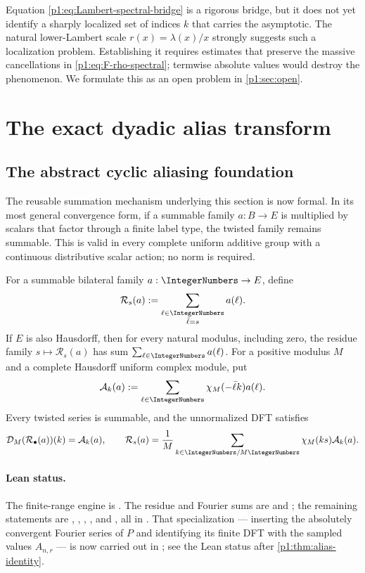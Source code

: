 \documentclass[11pt,oneside]{article}
\theoremstyle{definition}
\theoremstyle{remark}
\begin{document}
\begin{remark}
Equation \eqref{p1:eq:Lambert-spectral-bridge} is a rigorous bridge, but it does not
yet identify a sharply localized set of indices $k$ that carries the asymptotic.
The natural lower-Lambert scale $r(x)=\lambda(x)/x$ strongly suggests such a
localization problem.  Establishing it requires estimates that preserve the
massive cancellations in \eqref{p1:eq:F-rho-spectral}; termwise absolute values
would destroy the phenomenon.  We formulate this as an open problem in
\cref{p1:sec:open}.
\end{remark}

\section{The exact dyadic alias transform}\label{p1:sec:dct}

\subsection{The abstract cyclic aliasing foundation}

The reusable summation mechanism underlying this section is now formal.  In
its most general convergence form, if a summable family \(a:B\to E\) is
multiplied by scalars that factor through a finite label type, the twisted
family remains summable.  This is valid in every complete uniform additive
group with a continuous distributive scalar action; no norm is required.

For a summable bilateral family \(a:\IntegerNumbers\to E\), define
\[
 \mathcal R_s(a):=\sum_{\substack{\ell\in\IntegerNumbers\\\bar\ell=s}}a(\ell).
\]
If \(E\) is also Hausdorff, then for every natural modulus, including zero,
the residue family
\(s\mapsto\mathcal R_s(a)\) has sum \(\sum_{\ell\in\IntegerNumbers}a(\ell)\).
For a positive modulus \(M\) and a complete Hausdorff uniform complex
module, put
\[
 \mathcal A_k(a):=
 \sum_{\ell\in\IntegerNumbers}\chi_M(-\bar\ell k)a(\ell).
\]
Every twisted series is summable, and the unnormalized DFT satisfies
\[
 \mathcal D_M(\mathcal R_\bullet(a))(k)=\mathcal A_k(a),
 \qquad
 \mathcal R_s(a)=\frac1M\sum_{k\in\IntegerNumbers/M\IntegerNumbers}
   \chi_M(ks)\mathcal A_k(a).
\]

\paragraph{Lean status.}
The finite-range engine is
.  The residue and Fourier sums are
 and ; the remaining
statements are
,
,
,
, and
, all in
.  That specialization --- inserting the
absolutely convergent Fourier series of \(P\) and identifying its finite DFT
with the sampled values \(A_{n,r}\) --- is now carried out in
; see the Lean status after
\cref{p1:thm:alias-identity}.
\end{document}
